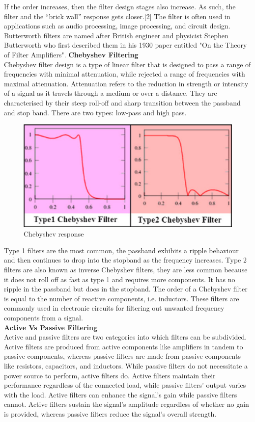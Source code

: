 \documentclass[12pt,a4paper]{article}
\begin{document}
				If the order increases, then the filter design stages also increase. As such, the filter and the “brick wall” response gets closer.[2] The filter is often used in applications 
				such as audio processing, image processing, and circuit design. Butterworth filters are named after British engineer and physicist Stephen Butterworth who first described
				them in his 1930 paper entitled "On the Theory of Filter Amplifiers".
\newpage
\vspace*{5mm}
			\textbf{Chebyshev Filtering}\\
				Chebyshev filter design is a type of linear filter that is designed to pass a range of frequencies with minimal attenuation, while rejected a range of frequencies with maximal attenuation. Attenuation refers to the reduction in strength or intensity of a signal as it travels through a medium or over a distance. They are characterised by their steep roll-off and sharp transition between the passband and stop band. There are two types: low-pass and high pass.
				\begin{figure}[H]
					\begin{center}
						\includegraphics[width=0.7\linewidth]{Chebyshev_response}
					\end{center}
					\caption{Chebyshev response}
				\end{figure}
			Type 1 filters are the most common, the passband exhibits a ripple behaviour and then continues to drop into the stopband as the frequency increases. Type 2 filters are also known as inverse Chebyshev filters, they are less common because it does not roll off as fast as type 1 and requires more components. It has no ripple in the passband but does in the stopband. The order of a Chebyshev filter is equal to the number of reactive components, i.e. inductors\cite{Chebyshev}.
			These filters are commonly used in electronic circuits for filtering out unwanted frequency components from a signal.\\
			\textbf{Active Vs Passive Filtering}\\
			Active and passive filters are two categories into which filters can be subdivided. Active filters are produced from active components like amplifiers in tandem to passive components, whereas passive filters are made from passive components like resistors, capacitors, and inductors. While passive filters do not necessitate a power source to perform, active filters do. Active filters maintain their performance regardless of the connected load, while passive filters' output varies with the load. Active filters can enhance the signal's gain while passive filters cannot. Active filters sustain the signal's amplitude regardless of whether no gain is provided, whereas passive filters reduce the signal's overall strength.
			\newpage
\end{document}
